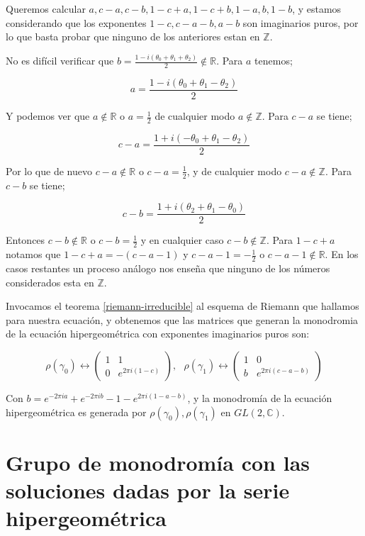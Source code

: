  Queremos calcular $a,c-a,c-b,1-c+a,1-c+b,1-a,b,1-b$, y estamos considerando que los exponentes $ 1-c,c-a-b,a-b$ son imaginarios puros, por lo que basta probar que ninguno de los anteriores estan en $\mathbb{Z}$.

No es dif\'icil verificar que $b = \frac{1-i(\theta_{0} + \theta_{1} +\theta_{2})}{2} \notin \mathbb{R}$. Para $a$ tenemos;

$$a= \frac{1-i(\theta_{0} + \theta_{1} - \theta_{2})}{2}$$

Y podemos ver que $a \notin \mathbb{R}$ o $ a = \frac{1}{2}$  de cualquier modo $a \notin \mathbb{Z}$. Para $c-a$ se tiene;

$$c-a = \frac{1 + i (-\theta_{0} + \theta_{1} - \theta_{2})}{2}$$

Por lo que de nuevo $c-a \notin \mathbb{R}$ o $c-a = \frac{1}{2}$, y de cualquier modo $c-a \notin \mathbb{Z}$. Para $c-b$ se tiene;

$$c-b =\frac{1+i(\theta_{2} + \theta_{1} - \theta_{0})}{2} $$

Entonces $c-b \notin \mathbb{R}$ o $c-b =\frac{1}{2}$ y en cualquier caso $c-b \notin \mathbb{Z}$. Para $1-c+a$ notamos que $1-c+a= - (c-a-1 )$ y $c-a-1 = -\frac{1}{2}$ o $c-a-1 \notin \mathbb{R}$. En los casos restantes un proceso an\'alogo nos enseña que ninguno de los n\'umeros considerados esta en $\mathbb{Z}$.

Invocamos el teorema \ref{riemann-irreducible} al esquema de Riemann que hallamos para nuestra ecuaci\'on, y obtenemos que las matrices que generan la monodromia de la ecuaci\'on hipergeom\'etrica con exponentes imaginarios puros son:

$$ \rho (\gamma_{0}) \leftrightarrow  \begin{pmatrix}
 1& 1\\
 0& e^{2 \pi i (1-c)}
 \end{pmatrix}  ,\ \ \
\rho (\gamma_{1}) \leftrightarrow \begin{pmatrix}
 1& 0\\
 b& e^{2 \pi i (c-a-b)}
 \end{pmatrix}
$$

Con $b = e^{-2 \pi i a} + e^{-2 \pi i b} -1 -e^{2 \pi i (1-a-b)}$, y la monodrom\'ia de la ecuaci\'on hipergeom\'etrica es generada por $\rho (\gamma_{0}), \rho (\gamma_{1})$ en $GL(2, \mathbb{C})$.


\section{Grupo de monodrom\'ia con las soluciones dadas por la serie hipergeom\'etrica}

